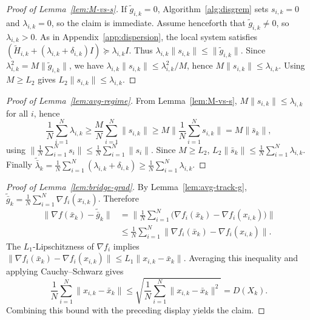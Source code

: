 \documentclass[review,onefignum,onetabnum]{siamart171218}
\begin{document}
	\begin{proof}[Proof of Lemma~\ref{lem:M-vs-s}]
		If $\tilde g_{i,k}=0$, Algorithm~\ref{alg:disgrem} sets
		$s_{i,k}=0$ and $\lambda_{i,k}=0$, so the claim is immediate.
		Assume henceforth that $\tilde g_{i,k}\ne0$, so
		$\lambda_{i,k}>0$.
		As in Appendix~\ref{app:dispersion}, the local system satisfies
		$(\tilde H_{i,k}+(\lambda_{i,k}+\delta_{i,k})I)\succeq \lambda_{i,k}I$.
		Thus $\lambda_{i,k}\|s_{i,k}\|\le \|\tilde g_{i,k}\|$.
		Since $\lambda_{i,k}^2=M\|\tilde g_{i,k}\|$, we have $\lambda_{i,k}\|s_{i,k}\|\le \lambda_{i,k}^2/M$,
		hence $M\|s_{i,k}\|\le \lambda_{i,k}$. Using $M\ge L_2$ gives $L_2\|s_{i,k}\|\le\lambda_{i,k}$.
	\end{proof}
	
	\begin{proof}[Proof of Lemma~\ref{lem:avg-regime}]
		From Lemma~\ref{lem:M-vs-s}, $M\|s_{i,k}\|\le \lambda_{i,k}$ for all $i$, hence
		\[
		\frac1N\sum_{i=1}^N\lambda_{i,k}\ge \frac{M}{N}\sum_{i=1}^N\|s_{i,k}\|\ge M\Big\|\frac1N\sum_{i=1}^N s_{i,k}\Big\|=M\|\bar s_k\|,
		\]
		using $\|\frac1N\sum_{i=1}^N s_i\|\le \frac1N\sum_{i=1}^N\|s_i\|$.
		Since $M\ge L_2$, $L_2\|\bar s_k\|\le \frac1N\sum_{i=1}^N\lambda_{i,k}$.
		Finally $\tilde{\bar\lambda}_k=\frac1N\sum_{i=1}^N(\lambda_{i,k}+\delta_{i,k})\ge \frac1N\sum_{i=1}^N\lambda_{i,k}$.
	\end{proof}
	
	\begin{proof}[Proof of Lemma~\ref{lem:bridge-grad}]
		By Lemma~\ref{lem:avg-track-g}, $\tilde{\bar g}_k=\frac1N\sum_{i=1}^N\nabla f_i(x_{i,k})$.
		Therefore
		\begin{align*}
			\|\nabla f(\bar x_k)\!-\!\tilde{\bar g}_k\|
			&=\Big\|\tfrac1N\textstyle\sum_{i=1}^N\!\big(\nabla f_i(\bar x_k)\!-\!\nabla f_i(x_{i,k})\big)\Big\|\\
			&\le \tfrac1N\textstyle\sum_{i=1}^N \|\nabla f_i(\bar x_k)\!-\!\nabla f_i(x_{i,k})\|.
		\end{align*}
		The $L_1$-Lipschitzness of $\nabla f_i$ implies
		$\|\nabla f_i(\bar x_k)-\nabla f_i(x_{i,k})\|\le L_1\|x_{i,k}-\bar x_k\|$.
		Averaging this inequality and applying Cauchy--Schwarz gives
		\[
		\frac1N\sum_{i=1}^N\|x_{i,k}-\bar x_k\|
		\le \sqrt{\frac1N\sum_{i=1}^N\|x_{i,k}-\bar x_k\|^2}=D(X_k).
		\]
		Combining this bound with the preceding display yields the claim.
	\end{proof}
	
\end{document}
